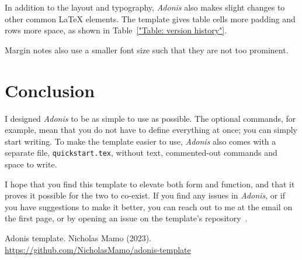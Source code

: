\documentclass{adonis}
\begin{document}
		In addition to the layout and typography, \textit{Adonis} also makes slight changes to other common \LaTeX{} elements.
		The template gives table cells more padding and rows more space, as shown in Table~\ref{"Table: version history"}.

		Margin notes also use a smaller font size such that they are not too prominent.
	
	\section{Conclusion}
	
		I designed \textit{Adonis} to be as simple to use as possible.
		The optional commands, for example, mean that you do not have to define everything at once; you can simply start writing.
		To make the template easier to use, \textit{Adonis} also comes with a separate file, \texttt{quickstart.tex}, without text, commented-out commands and space to write.
		
		I hope that you find this template to elevate both form and function, and that it proves it possible for the two to co-exist.
		If you find any issues in \textit{Adonis}, or if you have suggestions to make it better, you can reach out to me at the email on the first page, or by opening an issue on the template's repository~\cite{repository}.

	\begin{thebibliography}{5}
		Adonis template. Nicholas Mamo (2023). \url{https://github.com/NicholasMamo/adonis-template}
	\end{thebibliography}
	
\end{document}
